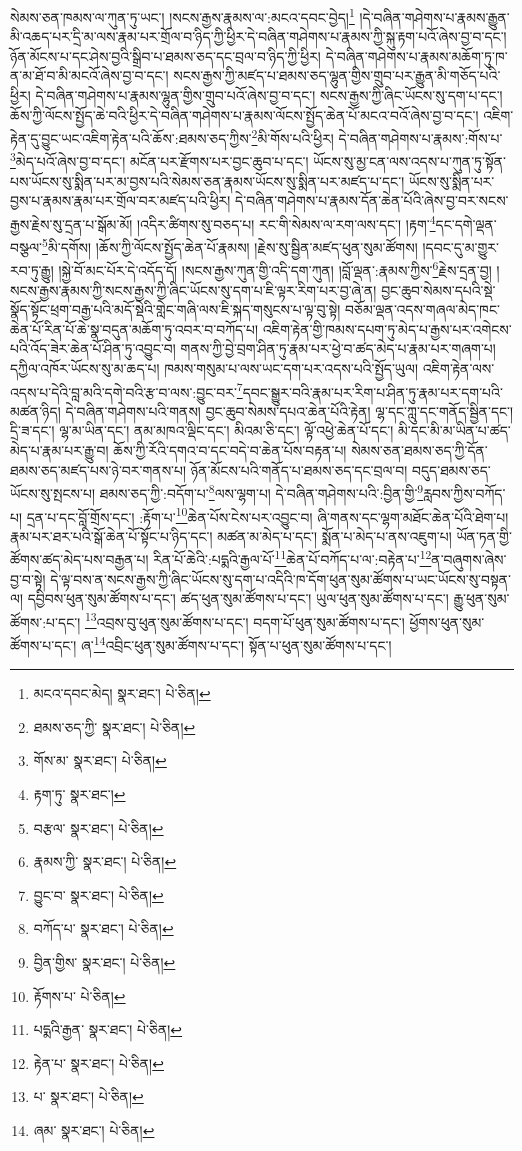 སེམས་ཅན་ཁམས་ལ་ཀུན་ཏུ་ཡང་། །སངས་རྒྱས་རྣམས་ལ་:མངའ་དབང་བྱེད།\footnote{མངའ་དབང་མེད།  སྣར་ཐང་།  པེ་ཅིན། } །དེ་བཞིན་གཤེགས་པ་རྣམས་རྒྱུན་མི་འཆད་པར་དྲི་མ་ལས་རྣམ་པར་གྲོལ་བ་ཉིད་ཀྱི་ཕྱིར་དེ་བཞིན་གཤེགས་པ་རྣམས་ཀྱི་སྐུ་རྟག་པའོ་ཞེས་བྱ་བ་དང་། ཉོན་མོངས་པ་དང་ཤེས་བྱའི་སྒྲིབ་པ་ཐམས་ཅད་དང་བྲལ་བ་ཉིད་ཀྱི་ཕྱིར། དེ་བཞིན་གཤེགས་པ་རྣམས་མཆོག་ཏུ་ཁ་ན་མ་ཐོ་བ་མི་མངའོ་ཞེས་བྱ་བ་དང་། སངས་རྒྱས་ཀྱི་མཛད་པ་ཐམས་ཅད་ལྷུན་གྱིས་གྲུབ་པར་རྒྱུན་མི་གཅོད་པའི་ཕྱིར། དེ་བཞིན་གཤེགས་པ་རྣམས་ལྷུན་གྱིས་གྲུབ་པའོ་ཞེས་བྱ་བ་དང་། སངས་རྒྱས་ཀྱི་ཞིང་ཡོངས་སུ་དག་པ་དང་། ཆོས་ཀྱི་ལོངས་སྤྱོད་ཆེ་བའི་ཕྱིར་དེ་བཞིན་གཤེགས་པ་རྣམས་ལོངས་སྤྱོད་ཆེན་པོ་མངའ་བའོ་ཞེས་བྱ་བ་དང་། འཇིག་རྟེན་དུ་བྱུང་ཡང་འཇིག་རྟེན་པའི་ཆོས་:ཐམས་ཅད་ཀྱིས་\footnote{ཐམས་ཅད་ཀྱི་  སྣར་ཐང་།  པེ་ཅིན། }མི་གོས་པའི་ཕྱིར། དེ་བཞིན་གཤེགས་པ་རྣམས་:གོས་པ་\footnote{གོས་མ་  སྣར་ཐང་།  པེ་ཅིན། }མེད་པའོ་ཞེས་བྱ་བ་དང་། མངོན་པར་རྫོགས་པར་བྱང་ཆུབ་པ་དང་། ཡོངས་སུ་མྱ་ངན་ལས་འདས་པ་ཀུན་ཏུ་སྟོན་པས་ཡོངས་སུ་སྨིན་པར་མ་བྱས་པའི་སེམས་ཅན་རྣམས་ཡོངས་སུ་སྨིན་པར་མཛད་པ་དང་། ཡོངས་སུ་སྨིན་པར་བྱས་པ་རྣམས་རྣམ་པར་གྲོལ་བར་མཛད་པའི་ཕྱིར། དེ་བཞིན་གཤེགས་པ་རྣམས་དོན་ཆེན་པོའི་ཞེས་བྱ་བར་སངས་རྒྱས་རྗེས་སུ་དྲན་པ་སྒོམ་མོ། །འདིར་ཚིགས་སུ་བཅད་པ། རང་གི་སེམས་ལ་རག་ལས་དང་། །རྟག་\footnote{རྟག་ཏུ་  སྣར་ཐང་། }དང་དགེ་ལྡན་བསྩལ་\footnote{བརྩལ་  སྣར་ཐང་།  པེ་ཅིན། }མི་དགོས། །ཆོས་ཀྱི་ལོངས་སྤྱོད་ཆེན་པོ་རྣམས། །རྗེས་སུ་སྦྱིན་མཛད་ཕུན་སུམ་ཚོགས། །དབང་དུ་མ་གྱུར་རབ་ཏུ་རྒྱུ། །སྐྱེ་བོ་མང་པོར་དེ་འདོད་དོ། །སངས་རྒྱས་ཀུན་གྱི་འདི་དག་ཀུན། །བློ་ལྡན་:རྣམས་ཀྱིས་\footnote{རྣམས་ཀྱི་  སྣར་ཐང་།  པེ་ཅིན། }རྗེས་དྲན་བྱ། །སངས་རྒྱས་རྣམས་ཀྱི་སངས་རྒྱས་ཀྱི་ཞིང་ཡོངས་སུ་དག་པ་ཇི་ལྟར་རིག་པར་བྱ་ཞེ་ན། བྱང་ཆུབ་སེམས་དཔའི་སྡེ་སྣོད་སྟོང་ཕྲག་བརྒྱ་པའི་མདོ་སྡེའི་གླེང་གཞི་ལས་ཇི་སྐད་གསུངས་པ་ལྟ་བུ་སྟེ། བཅོམ་ལྡན་འདས་གཞལ་མེད་ཁང་ཆེན་པོ་རིན་པོ་ཆེ་སྣ་བདུན་མཆོག་ཏུ་འབར་བ་བཀོད་པ། འཇིག་རྟེན་གྱི་ཁམས་དཔག་ཏུ་མེད་པ་རྒྱས་པར་འགེངས་པའི་འོད་ཟེར་ཆེན་པོ་ཤིན་ཏུ་འབྱུང་བ། གནས་ཀྱི་བྱེ་བྲག་ཤིན་ཏུ་རྣམ་པར་ཕྱེ་བ་ཚད་མེད་པ་རྣམ་པར་གཞག་པ། དཀྱིལ་འཁོར་ཡོངས་སུ་མ་ཆད་པ། ཁམས་གསུམ་པ་ལས་ཡང་དག་པར་འདས་པའི་སྤྱོད་ཡུལ། འཇིག་རྟེན་ལས་འདས་པ་དེའི་བླ་མའི་དགེ་བའི་རྩ་བ་ལས་:བྱུང་བར་\footnote{བྱུང་བ་  སྣར་ཐང་།  པེ་ཅིན། }དབང་སྒྱུར་བའི་རྣམ་པར་རིག་པ་ཤིན་ཏུ་རྣམ་པར་དག་པའི་མཚན་ཉིད། དེ་བཞིན་གཤེགས་པའི་གནས། བྱང་ཆུབ་སེམས་དཔའ་ཆེན་པོའི་རྟེན། ལྷ་དང་ཀླུ་དང་གནོད་སྦྱིན་དང་། དྲི་ཟ་དང་། ལྷ་མ་ཡིན་དང་། ནམ་མཁའ་ལྡིང་དང་། མིའམ་ཅི་དང་། ལྟོ་འཕྱེ་ཆེན་པོ་དང་། མི་དང་མི་མ་ཡིན་པ་ཚད་མེད་པ་རྣམ་པར་རྒྱུ་བ། ཆོས་ཀྱི་རོའི་དགའ་བ་དང་བདེ་བ་ཆེན་པོས་བརྟན་པ། སེམས་ཅན་ཐམས་ཅད་ཀྱི་དོན་ཐམས་ཅད་མཛད་པས་ཉེ་བར་གནས་པ། ཉོན་མོངས་པའི་གནོད་པ་ཐམས་ཅད་དང་བྲལ་བ། བདུད་ཐམས་ཅད་ཡོངས་སུ་སྤངས་པ། ཐམས་ཅད་ཀྱི་:བདོག་པ་\footnote{བཀོད་པ་  སྣར་ཐང་།  པེ་ཅིན། }ལས་ལྷག་པ། དེ་བཞིན་གཤེགས་པའི་:བྱིན་གྱི་\footnote{བྱིན་གྱིས་  སྣར་ཐང་།  པེ་ཅིན། }རླབས་ཀྱིས་བཀོད་པ། དྲན་པ་དང་བློ་གྲོས་དང་། :རྟོག་པ་\footnote{རྟོགས་པ་  པེ་ཅིན། }ཆེན་པོས་ངེས་པར་འབྱུང་བ། ཞི་གནས་དང་ལྷག་མཐོང་ཆེན་པོའི་ཐེག་པ། རྣམ་པར་ཐར་པའི་སྒོ་ཆེན་པོ་སྟོང་པ་ཉིད་དང་། མཚན་མ་མེད་པ་དང་། སྨོན་པ་མེད་པ་ནས་འཇུག་པ། ཡོན་ཏན་གྱི་ཚོགས་ཚད་མེད་པས་བརྒྱན་པ། རིན་པོ་ཆེའི་:པདྨའི་རྒྱལ་པོ་\footnote{པདྨའི་རྒྱན་  སྣར་ཐང་།  པེ་ཅིན། }ཆེན་པོ་བཀོད་པ་ལ་:བརྟེན་པ་\footnote{རྟེན་པ་  སྣར་ཐང་།  པེ་ཅིན། }ན་བཞུགས་ཞེས་བྱ་བ་སྟེ། དེ་ལྟ་བས་ན་སངས་རྒྱས་ཀྱི་ཞིང་ཡོངས་སུ་དག་པ་འདིའི་ཁ་དོག་ཕུན་སུམ་ཚོགས་པ་ཡང་ཡོངས་སུ་བསྟན་ལ། དབྱིབས་ཕུན་སུམ་ཚོགས་པ་དང་། ཚད་ཕུན་སུམ་ཚོགས་པ་དང་། ཡུལ་ཕུན་སུམ་ཚོགས་པ་དང་། རྒྱུ་ཕུན་སུམ་ཚོགས་:པ་དང་། \footnote{པ་  སྣར་ཐང་།  པེ་ཅིན། }འབྲས་བུ་ཕུན་སུམ་ཚོགས་པ་དང་། བདག་པོ་ཕུན་སུམ་ཚོགས་པ་དང་། ཕྱོགས་ཕུན་སུམ་ཚོགས་པ་དང་། ཞ་\footnote{ཞམ་  སྣར་ཐང་།  པེ་ཅིན། }འབྲིང་ཕུན་སུམ་ཚོགས་པ་དང་། སྟོན་པ་ཕུན་སུམ་ཚོགས་པ་དང་། 